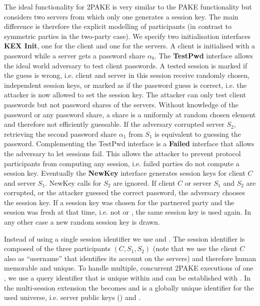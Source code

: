 \noindent
The ideal functionality for 2PAKE is very similar to the PAKE functionality but considers two servers from which only one generates a session key.
The main difference is therefore the explicit modelling of participants (in contrast to symmetric parties in the two-party case).
We specify two initialisation interfaces \textbf{KEX Init}, one for the client and one for the servers.
A client is initialised with a password \pwd while a server gets a password share $\alpha_b$.
The \textbf{TestPwd} interface allows the ideal world adversary to test client passwords.
A tested session is marked \interrupted if the guess is wrong, i.e. client and server in this session receive randomly chosen, independent session keys, or marked as \compromised if the password guess is correct, i.e. the attacker is now allowed to set the session key.
The attacker can only test client passwords but not password shares of the servers.
Without knowledge of the password or any password share, a share is a uniformly at random chosen element and therefore not efficiently guessable.
If the adversary corrupted server $S_2$, retrieving the second password share $\alpha_1$ from $S_1$ is equivalent to guessing the password.
Complementing the TestPwd interface is a \textbf{Failed} interface that allows the adversary to let sessions fail.
This allows the attacker to prevent protocol participants from computing any session, i.e. failed parties do not compute a session key.
Eventually the \textbf{NewKey} interface generates session keys for client $C$ and server $S_1$.
NewKey calls for $S_2$ are ignored.
If client $C$ or server $S_1$ and $S_2$ are corrupted, or the attacker guessed the correct password, the adversary chooses the session key.
If a session key was chosen for the partnered party and the session was fresh at that time, i.e. not \compromised or \interrupted, the same session key is used again.
In any other case a new random session key is drawn.

Instead of using a single session identifier \sid we use \sid and \qid.
The session identifier \sid is composed of the three participants $(C,S_1,S_2)$ (note that we use the client $C$ also as ``username'' that identifies its account on the servers) and therefore human memorable and unique.
To handle multiple, concurrent 2PAKE executions of one \sid, we use a query identifier \qid that is unique within \sid and can be established with \Finit.
In the multi-session extension \FTWOPAKEM the \sid becomes \ssid and \sid is a globally unique identifier for the used universe, i.e. server public keys (\CA) and \crs.


